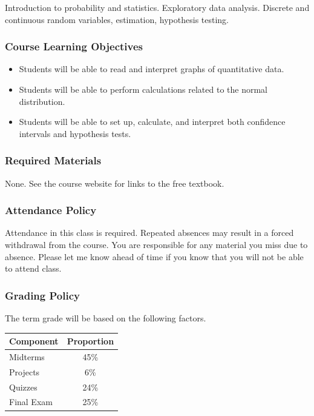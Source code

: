 \documentclass[10pt]{article}
\begin{document}
Introduction to probability and statistics. Exploratory data analysis. Discrete and continuous random variables, estimation, hypothesis testing.

\subsubsection*{Course Learning Objectives}

\begin{itemize}

\item Students will be able to read and interpret graphs of quantitative data.
\item Students will be able to perform calculations related to the normal distribution. 
\item Students will be able to set up, calculate, and interpret both confidence intervals and hypothesis tests.

\end{itemize}

\subsubsection*{Required Materials}

None. See the course website for links to the free textbook.

%
\subsubsection*{Attendance Policy}

Attendance in this class is required. Repeated absences may result in a forced withdrawal from the course. You are responsible for any material you miss due to absence. Please let me know ahead of time if you know that you will not be able to attend class.

\subsubsection*{Grading Policy}

The term grade will be based on the following factors.

\begin{center}
\begin{tabular}{|l|c|}
\hline
Component      & Proportion \\ \hline
Midterms  & 45\% \\
Projects  & 6\% \\
Quizzes  & 24\% \\
Final Exam  & 25\% \\ \hline
\end{tabular}
\end{center}
\end{document}
